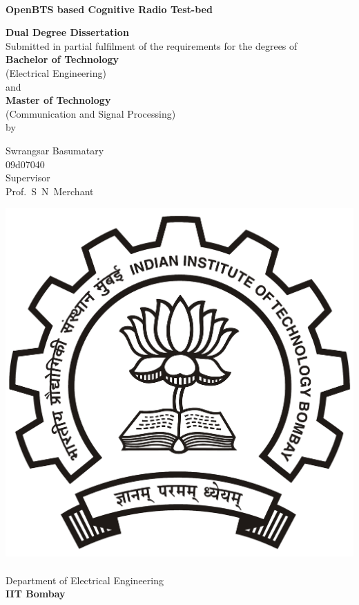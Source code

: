 \begin{titlepage}
\begin{center}
\begin{spacing}{1.0}


~\\[0.3cm]
{ \LARGE \bfseries OpenBTS based Cognitive Radio Test-bed\\[1.2cm] }

\textbf{\large Dual Degree Dissertation}\\[1.2cm]

{Submitted in partial fulfilment of the requirements for the degrees 
of\\[0.1cm]
\textbf{Bachelor of Technology} \\[0.1cm]
(Electrical Engineering) \\[0.1cm]
and \\[0.1cm]
\textbf{Master of Technology}\\[0.1cm]
(Communication and Signal Processing) \\[0.3cm]
by\\[0.3cm]}

{\LARGE Swrangsar Basumatary \\[0.1cm]}
{09d07040 \\[1cm]}
{Supervisor \\[0.1cm]}
{\LARGE Prof.~S~N~Merchant \\[1.5cm]}

\includegraphics[width=0.21\textheight]{../images/iitbLogo}~\\[0.9cm]
Department of Electrical Engineering\\[0.2cm]
\textbf{\large IIT Bombay}\\[0.9cm]





\end{spacing}
\end{center}
\end{titlepage}
